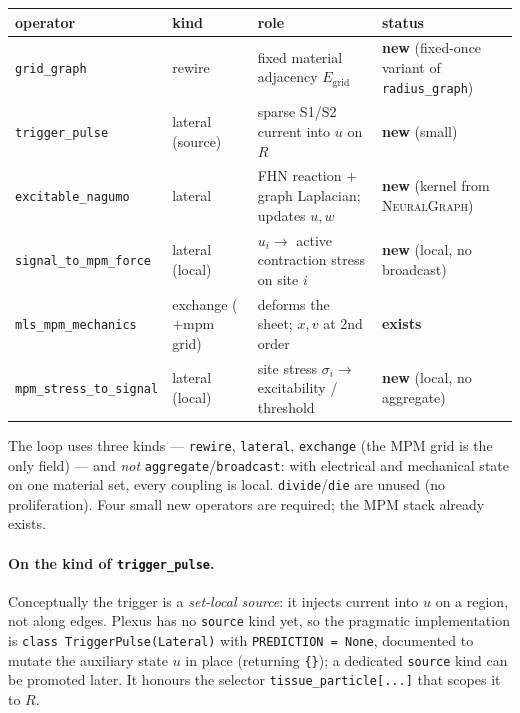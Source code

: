 \documentclass[11pt]{article}
\newcommand{\code}[1]{\texttt{#1}}
\newcommand{\op}[1]{\textcolor{cop}{\texttt{#1}}}
\begin{document}
\begin{center}
\renewcommand{\arraystretch}{1.25}
\footnotesize
\begin{tabular}{@{}llll@{}}
\toprule
\textbf{operator} & \textbf{kind} & \textbf{role} & \textbf{status} \\
\midrule
\op{grid\_graph}            & rewire        & fixed material adjacency $E_{\mathrm{grid}}$            & \textbf{new} (fixed-once variant of \code{radius\_graph}) \\
\op{trigger\_pulse}         & lateral (source) & sparse S1/S2 current into $u$ on $R$                 & \textbf{new} (small) \\
\op{excitable\_nagumo}      & lateral       & FHN reaction $+$ graph Laplacian; updates $u,w$         & \textbf{new} (kernel from \textsc{NeuralGraph}) \\
\op{signal\_to\_mpm\_force} & lateral (local) & $u_i\!\to$ active contraction stress on site $i$       & \textbf{new} (local, no broadcast) \\
\op{mls\_mpm\_mechanics}    & exchange ($+$mpm grid) & deforms the sheet; $x,v$ at 2nd order           & \textbf{exists} \\
\op{mpm\_stress\_to\_signal}& lateral (local) & site stress $\sigma_i\!\to$ excitability / threshold   & \textbf{new} (local, no aggregate) \\
\bottomrule
\end{tabular}
\end{center}

The loop uses three kinds --- \code{rewire}, \code{lateral}, \code{exchange} (the MPM
grid is the only field) --- and \emph{not} \code{aggregate}/\code{broadcast}: with
electrical and mechanical state on one material set, every coupling is local.
\code{divide}/\code{die} are unused (no proliferation). Four small new operators are
required; the MPM stack already exists.

\paragraph{On the kind of \code{trigger\_pulse}.}
Conceptually the trigger is a \emph{set-local source}: it injects current into $u$
on a region, not along edges. Plexus has no \code{source} kind yet, so the pragmatic
implementation is \code{class TriggerPulse(Lateral)} with \code{PREDICTION = None},
documented to mutate the auxiliary state $u$ in place (returning \code{\{\}}); a
dedicated \code{source} kind can be promoted later. It honours the selector
\code{tissue\_particle[...]} that scopes it to $R$.
\end{document}

